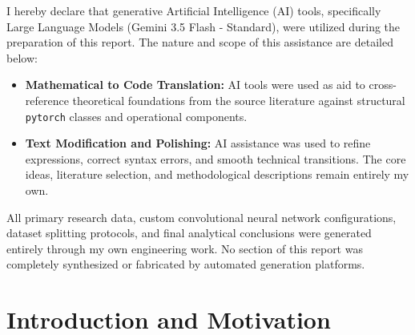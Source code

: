 \documentclass[12pt,hitec]{report}
\begin{document}
I hereby declare that generative Artificial Intelligence (AI) tools, specifically Large Language Models (Gemini 3.5 Flash - Standard), were utilized during the preparation of this report. The nature and scope of this assistance are detailed below:

\begin{itemize}
    \item \textbf{Mathematical to Code Translation:} AI tools were used as aid to cross-reference theoretical foundations from the source literature against structural \lstinline{pytorch} classes and operational components.
    \item \textbf{Text Modification and Polishing:} AI assistance was used to refine expressions, correct syntax errors, and smooth technical transitions. The core ideas, literature selection, and methodological descriptions remain entirely my own.
\end{itemize}

All primary research data, custom convolutional neural network configurations, dataset splitting protocols, and final analytical conclusions were generated entirely through my own engineering work. No section of this report was completely synthesized or fabricated by automated generation platforms.

\vspace{1.5cm}

\newpage




\begin{abstract}
    Speech Emotion Recognition (SER) on limited datasets such as RAVDESS often leads to model overfitting. This study investigates a Supervised Contrastive Learning (SupCon) pipeline combined with multi-view SpecAugment to extract invariant emotional representations rather than memorizing specific acoustic frequencies. The experimental results demonstrate that the SupCon architecture increases the clean test accuracy from a 53\% baseline to 60\% compared to a standard Cross-Entropy approach. Additionally, the proposed methodology exhibits improved classification stability under heavy Gaussian noise degradation.
\end{abstract}



\section{Introduction and Motivation}
\end{document}

